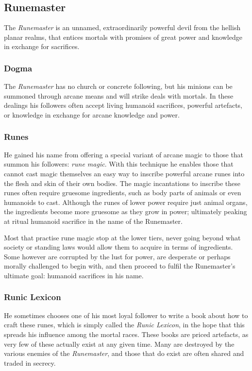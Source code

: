 \subsection*{Runemaster}

The \emph{Runemaster} is an unnamed, extraordinarily powerful devil from the
hellish planar realms, that entices mortals with promises of great power and
knowledge in exchange for sacrifices.

\subsubsection*{Dogma}

The \emph{Runemaster} has no church or concrete following, but his minions can
be summoned through arcane means and will strike deals with mortals. In these
dealings his followers often accept living humanoid sacrifices, powerful
artefacts, or knowledge in exchange for arcane knowledge and power.

\subsubsection*{Runes}

He gained his name from offering a special variant of arcane magic to those
that summon his followers: \emph{rune magic}. With this technique he enables
those that cannot cast magic themselves an easy way to inscribe powerful
arcane runes into the flesh and skin of their own bodies. The magic
incantations to inscribe these runes often require gruesome ingredients, such
as body parts of animals or even humanoids to cast. Although the runes of
lower power require just animal organs, the ingredients become more gruesome as
they grow in power; ultimately peaking at ritual humanoid sacrifice in the
name of the Runemaster.

Most that practise rune magic stop at the lower tiers, never going beyond what
society or standing laws would allow them to acquire in terms of
ingredients. Some however are corrupted by the lust for power, are desperate
or perhaps morally challenged to begin with, and then proceed to fulfil the
Runemaster's ultimate goal: humanoid sacrifices in his name.

\subsubsection*{Runic Lexicon}

He sometimes chooses one of his most loyal follower to write a book about how
to craft these runes, which is simply called the \emph{Runic Lexicon}, in the
hope that this spreads his influence among the mortal races. These books are
priced artefacts, as very few of these actually exist at any given time. Many
are destroyed by the various enemies of the \emph{Runemaster}, and those that
do exist are often shared and traded in secrecy.

